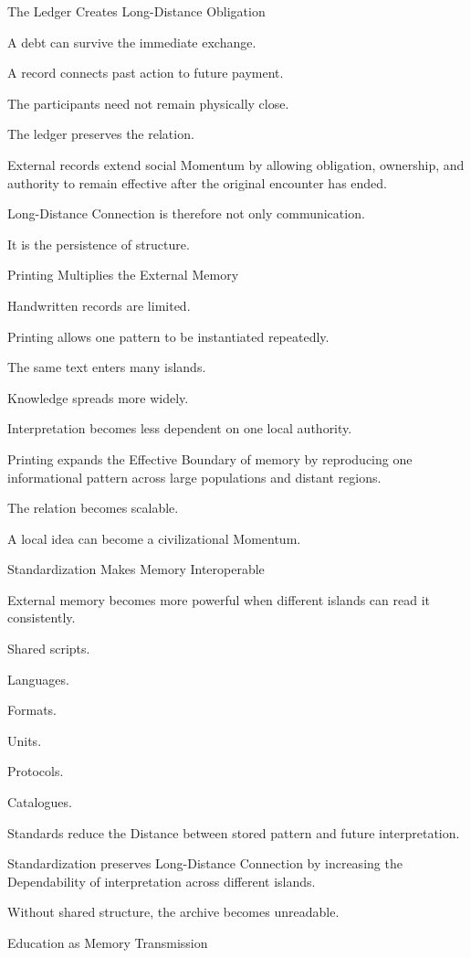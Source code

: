 The Ledger Creates Long-Distance Obligation

A debt can survive the immediate exchange.

A record connects past action to future payment.

The participants need not remain physically close.

The ledger preserves the relation.

External records extend social Momentum by allowing obligation, ownership, and authority to remain effective after the original encounter has ended.

Long-Distance Connection is therefore not only communication.

It is the persistence of structure.

Printing Multiplies the External Memory

Handwritten records are limited.

Printing allows one pattern to be instantiated repeatedly.

The same text enters many islands.

Knowledge spreads more widely.

Interpretation becomes less dependent on one local authority.

Printing expands the Effective Boundary of memory by reproducing one informational pattern across large populations and distant regions.

The relation becomes scalable.

A local idea can become a civilizational Momentum.

Standardization Makes Memory Interoperable

External memory becomes more powerful when different islands can read it consistently.

Shared scripts.

Languages.

Formats.

Units.

Protocols.

Catalogues.

Standards reduce the Distance between stored pattern and future interpretation.

Standardization preserves Long-Distance Connection by increasing the Dependability of interpretation across different islands.

Without shared structure, the archive becomes unreadable.

Education as Memory Transmission

